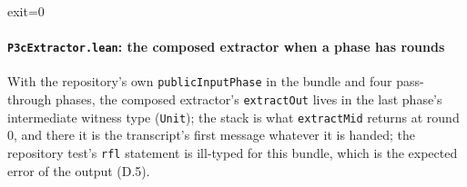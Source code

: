 
\begin{srccode}
exit=0
\end{srccode}

\paragraph{\texttt{P3cExtractor.lean}: the composed extractor when a phase has rounds}\label{sec:gen-probe-spine-P3cExtractor}

With the repository's own \texttt{publicInputPhase} in the bundle and four pass-through phases, the composed extractor's \texttt{extractOut} lives in the last phase's intermediate witness type (\texttt{Unit}); the stack is what \texttt{extractMid} returns at round 0, and there it is the transcript's first message whatever it is handed; the repository test's \texttt{rfl} statement is ill-typed for this bundle, which is the expected error of the output (D.5).


